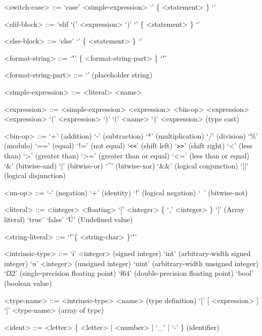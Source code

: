 \documentclass{article}
\begin{document}
\begin{grammar}
  <switch-case> ::= `case' <simple-expression> `{' \{ <statement> \} `}'

  <elif-block> ::= `elif `(' <expression> `)' `{' \{ <statement> \} `}'

  <else-block> ::= `else' `{' \{ <statement> \} `}'

  <format-string> ::= `"' \{ <format-string-part> \} `"'
  
  <format-string-part> ::= `{}' (placeholder string)

  <simple-expression> ::= <literal>
  \alt <name> 

  <expression> ::= <simple-expression>
  \alt <expression> <bin-op> <expression>
   <expression>
  \alt `(' <expression> `)'
  \alt `(' <name> `)' <expression> (type cast)

  <bin-op> ::= `+' (addition)
  \alt `-' (subtraction)
  \alt `*' (multiplication)
  \alt `/' (division)
  \alt `\%' (modulo)
  \alt `==' (equal)
  \alt `!=' (not equal)
  \alt `\verb!<<!' (shift left)
  \alt `\verb!>>!' (shift right)
  \alt `<' (less than)
  \alt `>' (greater than)
  \alt `>=' (greater than or equal)
  \alt `<=' (less than or equal)
  \alt `\&' (bitwise-and)
  \alt `|' (bitwise-or)
  \alt `^' (bitwise-xor)
  \alt `\&\&' (logical conjunction)
  \alt `||' (logical disjunction)

  <un-op> ::= `-' (negation)
  \alt `+' (identity)
  \alt `!' (logical negation)
  \alt `~' (bitwise-not)

  <literal> ::= <integer>
  \alt <floating>
  \alt `[' <integer> \{ `,' <integer> \} `]' (Array literal)  
  \alt `true'
  \alt `false'
  \alt `\'U' (Undefined value)

  <string-literal> ::= `"'\{ <string-char> \}`"'

  <intrinsic-type> ::= `i' <integer> (signed integer)
  \alt `int' (arbitrary-width signed integer)
  \alt `u' <integer> (unsigned integer)
  \alt `uint' (arbitrary-width unsigned integer)
  \alt `f32' (single-precision floating point)
  \alt `f64' (double-precision floating point)
  \alt `bool' (boolean value)
  
  <type-name> ::= <intrinsic-type>
  \alt <name> (type definition)
  \alt `[' [ <expression> ] `]' <type-name> (array of type)

  <ident> ::= <letter> \{ <letter> | <number> | `_' | `-' \} (identifier)


\end{grammar}
\end{document}
